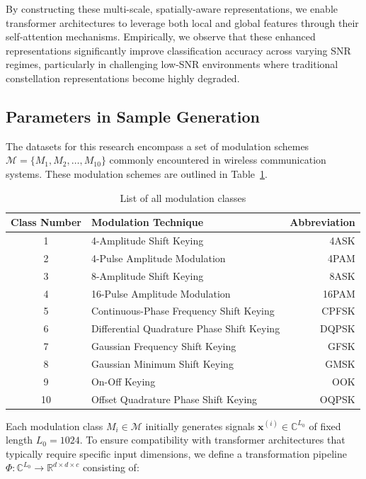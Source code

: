 By constructing these multi-scale, spatially-aware representations, we enable transformer architectures to leverage both local and global features through their self-attention mechanisms. Empirically, we observe that these enhanced representations significantly improve classification accuracy across varying SNR regimes, particularly in challenging low-SNR environments where traditional constellation representations become highly degraded.

\subsection{Parameters in Sample Generation}

The datasets for this research encompass a set of modulation schemes $\mathcal{M} = \{M_1, M_2, \ldots, M_{10}\}$ commonly encountered in wireless communication systems. These modulation schemes are outlined in Table~\ref{tab:modulation_classes}.

\begin{table}[htbp]
    \centering
    \caption{List of all modulation classes}
    \begin{tabular}{clr}
    \hline
    \textbf{Class Number} & \textbf{Modulation Technique} & \textbf{Abbreviation} \\
    \hline
    1 & 4-Amplitude Shift Keying & 4ASK \\
    2 & 4-Pulse Amplitude Modulation & 4PAM \\
    3 & 8-Amplitude Shift Keying & 8ASK \\
    4 & 16-Pulse Amplitude Modulation & 16PAM \\
    5 & Continuous-Phase Frequency Shift Keying & CPFSK \\
    6 & Differential Quadrature Phase Shift Keying & DQPSK \\
    7 & Gaussian Frequency Shift Keying & GFSK \\
    8 & Gaussian Minimum Shift Keying & GMSK \\
    9 & On-Off Keying & OOK \\
    10 & Offset Quadrature Phase Shift Keying & OQPSK \\
    \hline
    \end{tabular}
    \label{tab:modulation_classes}
\end{table}
    
Each modulation class $M_i \in \mathcal{M}$ initially generates signals $\mathbf{x}^{(i)} \in \mathbb{C}^{L_0}$ of fixed length $L_0 = 1024$. To ensure compatibility with transformer architectures that typically require specific input dimensions, we define a transformation pipeline $\Phi: \mathbb{C}^{L_0} \rightarrow \mathbb{R}^{d \times d \times c}$ consisting of:

